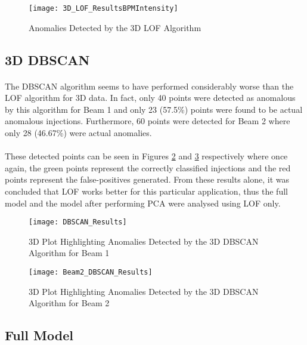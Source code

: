 \begin{figure}[H]
	\centering
	\texttt{[image: 3D\_LOF\_ResultsBPMIntensity]}
	\caption[3D LoF Results 2]{Anomalies Detected by the 3D LOF Algorithm}
	\label{fig::3D_results3}
\end{figure} 

\subsection{3D \acs{DBSCAN}}

\paragraph{ }The \acs{DBSCAN} algorithm seems to have performed considerably worse than the \acs{LOF} algorithm for 3D data. In fact, only 40 points were detected as anomalous by this algorithm for Beam 1 and only 23 (57.5\%) points were found to be actual anomalous injections. Furthermore, 60 points were detected for Beam 2 where only 28 (46.67\%) were actual anomalies. 

\paragraph{ }These detected points can be seen in Figures \ref{fig::3DBSCAN_results1} and \ref{fig::3DBSCAN_results2} respectively where once again, the green points represent the correctly classified injections and the red points represent the false-positives generated. From these results alone, it was concluded that \acs{LOF} works better for this particular application, thus the full model and the model after performing \acs{PCA} were analysed using \acs{LOF} only.

\begin{figure}[H]
	\centering
	\texttt{[image: DBSCAN\_Results]}
	\caption[3D DBSCAN Results Beam 1]{3D Plot Highlighting Anomalies Detected by the 3D DBSCAN Algorithm for Beam 1}
	\label{fig::3DBSCAN_results1}
\end{figure}

\begin{figure}[H]
	\centering
	\texttt{[image: Beam2\_DBSCAN\_Results]}
	\caption[3D DBSCAN Results Beam 2]{3D Plot Highlighting Anomalies Detected by the 3D DBSCAN Algorithm for Beam 2}
	\label{fig::3DBSCAN_results2}
\end{figure} 

\subsection{Full Model}
